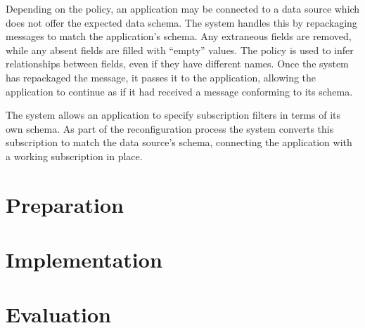 \documentclass[12pt,twoside,notitlepage]{report}
\begin{document}
Depending on the policy, an application may be connected to a data source which does not offer the expected data schema. 
The system handles this by repackaging messages to match the application's schema. Any extraneous fields are removed, while any absent fields are filled with ``empty'' values. The policy is used to infer relationships between fields, even if they have different names. 
Once the system has repackaged the message, it passes it to the application, allowing the application to continue as if it had received a message conforming to its schema.

The system allows an application to specify subscription filters in terms of its own schema. 
As part of the reconfiguration process the system converts this subscription to match the data source's schema, connecting the application with a working subscription in place.

\cleardoublepage

 
\chapter{Preparation}


\cleardoublepage


\chapter{Implementation}


\cleardoublepage


\chapter{Evaluation}
\end{document}
